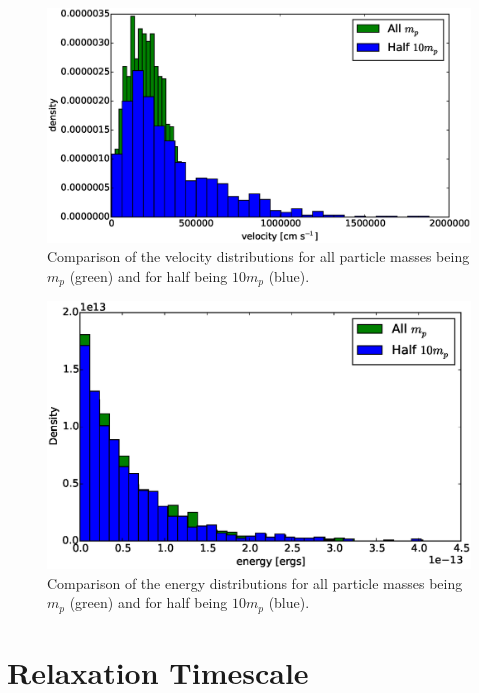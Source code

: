 \documentclass[12pt]{amsart}
\begin{document}
\begin{figure}[h!]
  \centering
    \includegraphics[width=1.0\textwidth]{vel_comp.eps}
    \caption{Comparison of the velocity distributions for all particle masses being $m_p$ (green) and for half being $10m_p$ (blue).}
\end{figure}

\begin{figure}[h!]
  \centering
    \includegraphics[width=1.0\textwidth]{energy_comp.eps}
    \caption{Comparison of the energy distributions for all particle masses being $m_p$ (green) and for half being $10m_p$ (blue).}
\end{figure}


\section{Relaxation Timescale}
\end{document}
